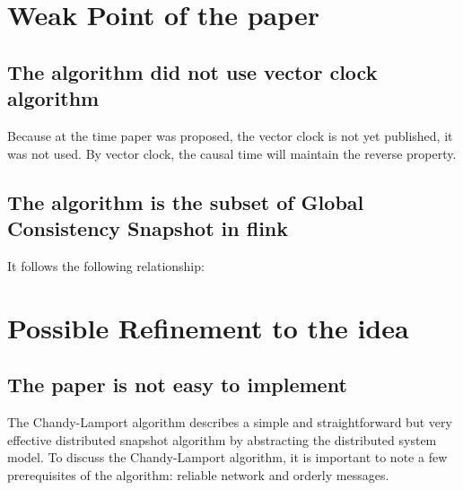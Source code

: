 \documentclass[acmlarge]{acmart}
\begin{document}
\section {Weak Point of the paper}
\subsection{The algorithm did not use vector clock algorithm}
Because at the time paper was proposed, the vector clock is not yet published, it was not used. By vector clock, the causal time will maintain the reverse property.
\subsection{The algorithm is the subset of Global Consistency Snapshot in flink \cite{carbone2015apache}}
It follows the following relationship:
\begin{center}\end{center}
\section{Possible Refinement to the idea}
\subsection {The paper is not easy to implement}
The Chandy-Lamport algorithm describes a simple and straightforward but very effective distributed snapshot algorithm by abstracting the distributed system model. To discuss the Chandy-Lamport algorithm, it is important to note a few prerequisites of the algorithm: reliable network and orderly messages.
\end{document}
